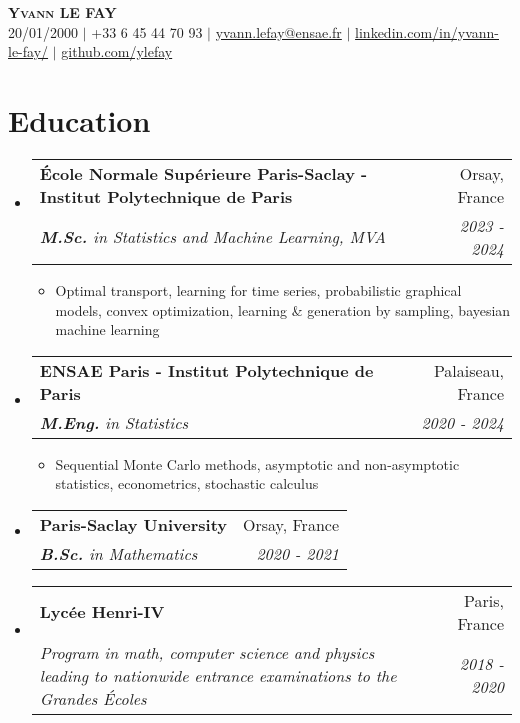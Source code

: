 \documentclass[letterpaper,10pt]{article}
\makeatletter
\newcommand{\resumeItem}[1]{
    \item\small{
            {#1 \vspace{-2pt}}
    }
}
\newcommand{\resumeSubheading}[4]{
    \vspace{-2pt}\item
    \begin{tabular*}{0.97\textwidth}[t]{l@{\extracolsep{\fill}}r}
        \textbf{#1}       & #2                 \\
        \textit{\small#3} & \textit{\small #4} \\
    \end{tabular*}\vspace{-7pt}
}
\newcommand{\resumeSubHeadingListStart}{\begin{itemize}[leftmargin=0.15in, label={}]}
\newcommand{\resumeSubHeadingListEnd}{\end{itemize}}
\newcommand{\resumeItemListStart}{\begin{itemize}}
\newcommand{\resumeItemListEnd}{\end{itemize}\vspace{-5pt}}
\makeatother
\begin{document}

\begin{center}
\textbf{\scshape Yvann LE FAY} \\ \vspace{1pt}
\small 20/01/2000 $|$ +33 6 45 44 70 93 $|$ \href{mailto:yvann.lefay@ensae.fr}{yvann.lefay@ensae.fr} $|$
\href{https://linkedin.com/in/yvann-le-fay/}{linkedin.com/in/yvann-le-fay/} $|$
\href{https://github.com/ylefay}{github.com/ylefay}
\end{center}


\section{Education}
\resumeSubHeadingListStart
\resumeSubheading
{\'Ecole Normale Supérieure Paris-Saclay - Institut Polytechnique de Paris}{Orsay, France}{\textbf{M.Sc.} in Statistics and Machine Learning, MVA}{2023 - 2024}
\resumeItemListStart
\resumeItem{Optimal transport, learning for time series, probabilistic graphical models, convex optimization, learning \& generation by sampling, bayesian machine learning}
\resumeItemListEnd
\resumeSubheading
{ENSAE Paris - Institut Polytechnique de Paris}{Palaiseau, France}{\textbf{M.Eng.} in Statistics}{2020 - 2024}
\resumeItemListStart
\resumeItem{Sequential Monte Carlo methods, asymptotic and non-asymptotic statistics, econometrics, stochastic calculus}%
\resumeItemListEnd
\resumeSubheading
{Paris-Saclay University}{Orsay, France}{\textbf{B.Sc.} in Mathematics }
{2020 - 2021}
\resumeSubheading{Lycée Henri-IV}{Paris, France}
{Program in math, computer science and physics leading to nationwide entrance examinations to the \textit{Grandes Écoles}}{2018 - 2020}
\resumeSubHeadingListEnd
\end{document}

